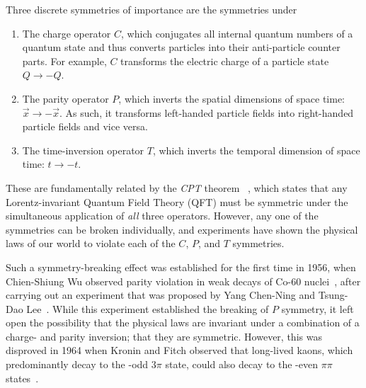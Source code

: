 Three discrete symmetries of importance are the symmetries under 
\begin{enumerate}
    \item The charge operator $C$, which conjugates all internal quantum numbers of a quantum state and thus converts particles into their anti-particle counter parts. For example, $C$ transforms the electric charge of a particle state $Q\to-Q$.
    \item The parity operator $P$, which inverts the spatial dimensions of space time: $\vec x \to -\vec x$. As such, it transforms left-handed particle fields into right-handed particle fields and vice versa.
    \item The time-inversion operator $T$, which inverts the temporal dimension of space time: $t\to -t$.
\end{enumerate}
These are fundamentally related by the \emph{CPT} theorem~\cite{ludersEquivalenceInvarianceTime1954} , which states that any Lorentz-invariant Quantum Field Theory (QFT) must be symmetric under the simultaneous application of \emph{all} three operators. However, any one of the symmetries can be broken individually, and experiments have shown the physical laws of our world to violate each of the $C$, $P$, and $T$ symmetries. 

Such a symmetry-breaking effect was established for the first time in 1956, when Chien-Shiung Wu observed parity violation in weak decays of Co-60 nuclei~\cite{wuExperimentalTestParity1957}, after carrying out an experiment that was proposed by Yang Chen-Ning and Tsung-Dao Lee~\cite{leeQuestionParityConservation1956}. While this experiment established the breaking of $P$ symmetry, it left open the possibility that the physical laws are invariant under a combination of a charge- and parity inversion; that they are \CP symmetric. However, this was disproved in 1964 when Kronin and Fitch observed that long-lived kaons, which predominantly decay to the \CP-odd $3\pi$ state, could also decay to the \CP-even $\pi\pi$ states~\cite{KroninFitch1964}. 

